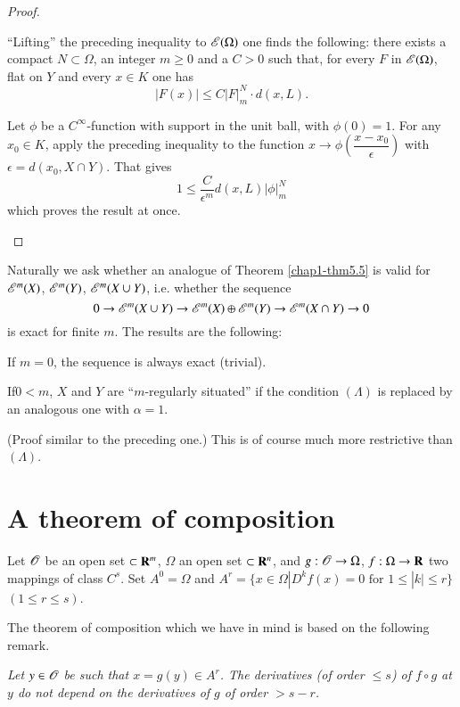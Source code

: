 \begin{proof}
\begin{itemize}
``Lifting'' the preceding inequality to $\mathscr{E}(\Omega)$ one finds the following: there exists a compact $N\subset \Omega$, an integer $m\geq 0$ and a $C>0$ such that, for every $F$ in $\mathscr{E}(\Omega)$, flat on $Y$ and every $x\in K$ one has
$$
|F(x)|\leq C|F|^{N}_{m}\cdot d(x,L).
$$

Let $\phi$ be a $C^{\infty}$-function with support in the unit ball, with $\phi(0)=1$. For any $x_{0}\in K$, apply the preceding inequality to the function $x\to \phi \left(\dfrac{x-x_{0}}{\epsilon}\right)$ with $\epsilon=d(x_{0},X\cap Y)$. That gives
$$
1\leq \dfrac{C}{\epsilon^{m}}d(x,L)|\phi|^{N}_{m}
$$
which proves the result at once.
\end{itemize}
\end{proof}

\begin{remark}\label{chap1-rem5.6}
Naturally we ask whether an analogue of Theorem \ref{chap1-thm5.5} is valid for $\mathscr{E}^{m}(X)$, $\mathscr{E}^{m}(Y)$, $\mathscr{E}^{m}(X\cup Y)$, i.e. whether the sequence
$$
0\to \mathscr{E}^{m}(X\cup Y)\to \mathscr{E}^{m}(X)\oplus \mathscr{E}^{m}(Y)\to \mathscr{E}^{m}(X\cap Y)\to 0
$$
is exact for finite $m$. The results are the following:

If $m=0$, the sequence is always exact (trivial).

If\pageoriginale $0<m$, $X$ and $Y$ are ``$m$-regularly situated'' if the condition $(\Lambda)$ is replaced by an analogous one with $\alpha=1$.
\end{remark}

(Proof similar to the preceding one.) This is of course much more restrictive than $(\Lambda)$.

\section{A theorem of composition\protect\footnotemark[1]}

Let $\mathscr{O}$ be an open set $\subset \mathbf{R}^{m}$, $\Omega$ an open set $\subset \mathbf{R}^{n}$, and $g:\mathscr{O}\to \Omega$, $f:\Omega\to \mathbf{R}$ two mappings of class $C^{s}$. Set $A^{0}=\Omega$ and $A^{r}=\{x\in \Omega|D^{k}f(x)=0 \text{ for } 1\leq |k|\leq r\}$ $(1\leq r\leq s)$.

The theorem of composition which we have in mind is based on the following remark.

{\em Let $y\in \mathscr{O}$ be such that $x=g(y)\in A^{r}$. The derivatives (of order $\leq s$) of $f\circ g$ at $y$ do not depend on the derivatives of $g$ of order $>s-r$.}


